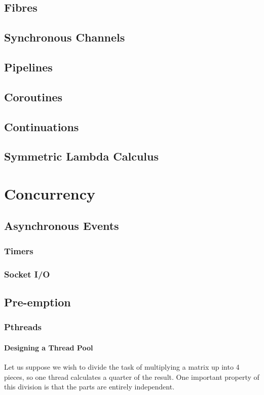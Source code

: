 \documentclass[oneside]{book}
\begin{document}
\chapter{Fibres}
\chapter{Synchronous Channels}
\chapter{Pipelines}
\chapter{Coroutines}
\chapter{Continuations}
\chapter{Symmetric Lambda Calculus}

\part{Concurrency}
\chapter{Asynchronous Events}
\section{Timers}
\section{Socket I/O}

\chapter{Pre-emption}
\section{Pthreads}
\subsection{Designing a Thread Pool}
Let us suppose we wish to divide the task of multiplying
a matrix up into 4 pieces, so one thread calculates
a quarter of the result. One important property of this 
division is that the parts are entirely independent.
\end{document}
